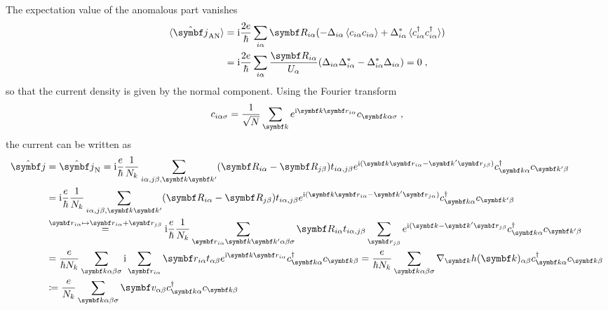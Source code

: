 \documentclass[../main.tex]{subfiles}
\begin{document}
The expectation value of the anomalous part vanishes
\begin{align}
	\braket{\ope{\vb{j}}_{\mathrm{AN}}} &= \iu \frac{2 e}{\hbar} \sum_{i\alpha} \vb{R}_{i \alpha} (-\Delta_{i \alpha} \braket{c_{i \alpha} c_{i \alpha}} + \Delta_{i \alpha}^* \braket{c_{i \alpha}^{\dagger} c_{i \alpha}^{\dagger}}) \\
	&= \iu \frac{2 e}{\hbar} \sum_{i\alpha} \frac{\vb{R}_{i \alpha}}{U_{\alpha}} (\Delta_{i \alpha} \Delta_{i \alpha}^* - \Delta_{i \alpha}^* \Delta_{i \alpha}) = 0 \;,
\end{align}
so that the current density is given by the normal component.
Using the Fourier transform
\begin{equation}
	c_{i \alpha \sigma} = \frac{1}{\sqrt{N}} \sum_{\vb{k}} e^{\iu \vb{k} \vb{r}_{i \alpha}} c_{\vb{k} \alpha \sigma} \;,
\end{equation}
the current can be written as
\begin{align}
	\ope{\vb{j}} &= \ope{\vb{j}}_{\mathrm{N}} = \iu \frac{e}{\hbar} \frac{1}{N_k} \sum_{i\alpha, j\beta, \vb{k} \vb{k}^{\prime}} (\vb{R}_{i \alpha} - \vb{R}_{j \beta}) t_{i \alpha, j \beta} e^{\iu (\vb{k} \vb{r}_{i \alpha} - \vb{k}^{\prime} \vb{r}_{j \beta})} c_{\vb{k} \alpha}^{\dagger} c_{\vb{k}^{\prime} \beta} \\
	&= \iu \frac{e}{\hbar} \frac{1}{N_k} \sum_{i\alpha, j\beta, \vb{k} \vb{k}^{\prime}} (\vb{R}_{i \alpha} - \vb{R}_{j \beta}) t_{i \alpha, j \beta} e^{\iu (\vb{k} \vb{r}_{i \alpha} - \vb{k}^{\prime} \vb{r}_{j \alpha})} c_{\vb{k} \alpha}^{\dagger} c_{\vb{k}^{\prime} \beta} \\
	&\overset{\vb{r}_{i \alpha} \mapsto \vb{r}_{i \alpha} + \vb{r}_{j \beta}}{=} \iu \frac{e}{\hbar} \frac{1}{N_k} \sum_{\vb{r}_{i \alpha} \vb{k} \vb{k}^{\prime} \alpha \beta \sigma} \vb{R}_{i \alpha} t_{i \alpha, j \beta} \sum_{\vb{r}_{j \beta}} e^{\iu (\vb{k} - \vb{k}^{\prime} \vb{r}_{j \beta}} c_{\vb{k} \alpha}^{\dagger} c_{\vb{k}^{\prime} \beta} \\
	&= \frac{e}{\hbar N_k} \sum_{\vb{k} \alpha \beta \sigma} \iu \sum_{\vb{r}_{i \alpha}} \vb{r}_{i \alpha} t_{\alpha \beta} e^{\iu \vb{k} \vb{r}_{i \alpha}} c_{\vb{k} \alpha}^{\dagger} c_{\vb{k} \beta} = \frac{e}{\hbar N_k} \sum_{\vb{k} \alpha \beta \sigma} \nabla_{\vb{k}} h(\vb{k})_{\alpha \beta} c_{\vb{k} \alpha}^{\dagger} c_{\vb{k} \beta} \\
	&\coloneq \frac{e}{N_k} \sum_{\vb{k} \alpha \beta \sigma} \vb{v}_{\alpha \beta} c_{\vb{k} \alpha}^{\dagger} c_{\vb{k} \beta}
\end{align}
\end{document}
